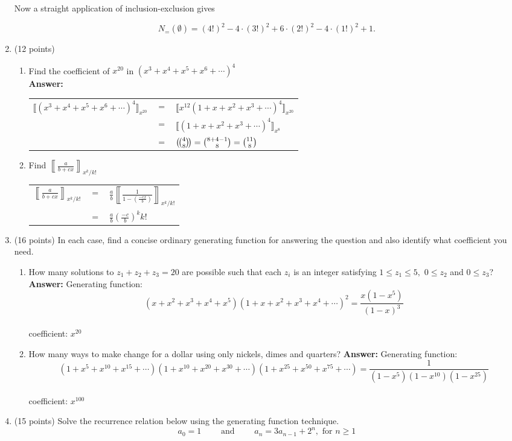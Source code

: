 \documentclass[11pt]{article}
\def\ldb{\llbracket}
\def\rdb{\rrbracket}
\newcommand{\textmultiset}[2]{\bigl(\!{\binom{#1}{#2}}\!\bigr)}
\newcommand{\displaymultiset}[2]{\left(\!{\binom{#1}{#2}}\!\right)}
\newcommand\multiset[2]{\mathchoice{\displaymultiset{#1}{#2}}
                                {\textmultiset{#1}{#2}}
                                {\textmultiset{#1}{#2}}
                                {\textmultiset{#1}{#2}}}
\begin{document}
\begin{enumerate}
Now a straight application of inclusion-exclusion gives

$$N_{=}( \emptyset)=(4!)^2-4\cdot(3!)^2+6\cdot(2!)^2-4\cdot (1!)^2+1.$$
\newpage
\item (12 points) 
	\begin{enumerate}
	\item Find the coefficient of $x^{20}$ in $(x^3+x^4+x^5+x^6+ \cdots)^4$\\
	\vfill
	\textbf{Answer:} \\
	
	\begin{tabular}{lcl}
	$\ldb (x^3+x^4+x^5+x^6+ \cdots)^4 \rdb_{x^{20}}$&$=$& $\ldb x^{12}(1+x+x^2+x^3+\cdots)^{4} \rdb_{x^{20}}$\\
	&$=$& $\ldb (1+x+x^2+x^3+\cdots)^{4} \rdb_{x^{8}}$\\
	&$=$& $\multiset{4}{8}={8+4-1 \choose 8}={11 \choose 8}$\\
	\end{tabular}
	\vfill
	\item Find $\displaystyle{\left\ldb \frac{a}{b+cx}\right \rdb_{x^k/k!}}$
	\vfill
	\begin{tabular}{lcl}
	$\displaystyle{\left\ldb \frac{a}{b+cx}\right \rdb_{x^k/k!}}$&$=$& $\displaystyle{\frac{a}{b}\left\ldb \frac{1}{1-\left(\frac{-cx}{b}\right)}\right \rdb_{x^k/k!}}$\\
	&$=$& $\displaystyle{\frac{a}{b}\left(\frac{-c}{b}\right)^{k}k!}$\\
	\end{tabular}
	\vfill

	\end{enumerate}
\item (16 points) In each case, find a concise ordinary generating function for answering the question and also identify what coefficient you need.
	\begin{enumerate}
	\item How many solutions to $z_1+z_2+z_3=20$ are possible such that each $z_i$ is an integer satisfying $1 \leq z_1 \leq 5,$ $0 \leq z_2$ and $0 \leq z_3$?
	\vfill
	\textbf{Answer:} Generating function: 
	$$(x+x^2+x^3+x^4+x^5)(1+x+x^2+x^3+x^4+\cdots)^2=\frac{x(1-x^5)}{(1-x)^3}$$\\
	coefficient: $x^{20}$\\
	\vfill
	\item How many ways to make change for a dollar using only nickels, dimes and quarters?
	\vfill
	\textbf{Answer:} Generating function: 
	$$(1+x^5+x^{10}+x^{15}+\cdots)(1+x^{10}+x^{20}+x^{30}+ \cdots)(1+x^{25}+x^{50}+x^{75}+\cdots)=\frac{1}{(1-x^5)(1-x^{10})(1-x^{25})}$$\\
	coefficient: $x^{100}$
	\vfill
	\end{enumerate}
	\newpage
\item (15 points) Solve the recurrence relation below using the generating function technique.\\
$$ a_0=1 \quad \quad \text{  and  } \quad \quad a_n=3a_{n-1}+2^n, \text{  for  } n \geq 1$$


\end{enumerate}
\end{document}
